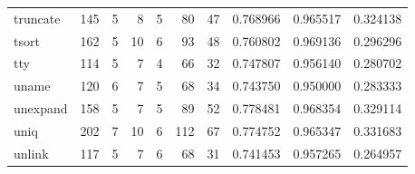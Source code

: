 \begin{longtable}{lrrrrrrrrr}
truncate  &                    145 &                                  5 &                                 8 &                                5 &                                80 &                              47 &                                0.768966 &                               0.965517 &                             0.324138 \\
tsort     &                    162 &                                  5 &                                10 &                                6 &                                93 &                              48 &                                0.760802 &                               0.969136 &                             0.296296 \\
tty       &                    114 &                                  5 &                                 7 &                                4 &                                66 &                              32 &                                0.747807 &                               0.956140 &                             0.280702 \\
uname     &                    120 &                                  6 &                                 7 &                                5 &                                68 &                              34 &                                0.743750 &                               0.950000 &                             0.283333 \\
unexpand  &                    158 &                                  5 &                                 7 &                                5 &                                89 &                              52 &                                0.778481 &                               0.968354 &                             0.329114 \\
uniq      &                    202 &                                  7 &                                10 &                                6 &                               112 &                              67 &                                0.774752 &                               0.965347 &                             0.331683 \\
unlink    &                    117 &                                  5 &                                 7 &                                6 &                                68 &                              31 &                                0.741453 &                               0.957265 &                             0.264957 \\

\end{longtable}
